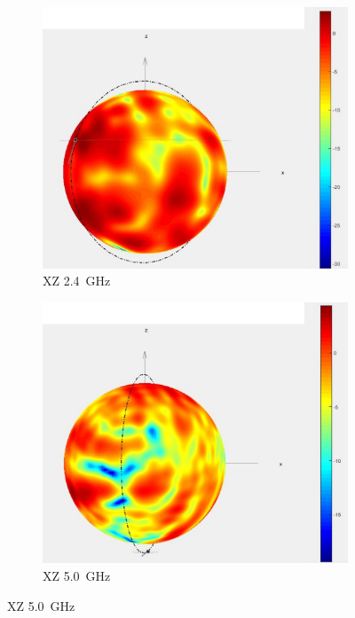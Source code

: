 \begin{figure}[h!]
\begin{center}
		\begin{subfigure}[t]{0.40\textwidth}
			\begin{center}
				\includegraphics[width=1\textwidth]{../fig/plt/star_lab_2ghz4_xz_reduced.png}
				\caption{XZ \SI{2.4}{\giga\hertz}}
			\end{center}
		\end{subfigure}
		\begin{subfigure}[t]{0.40\textwidth}
			\begin{center}
				\includegraphics[width=1\textwidth]{../fig/plt/star_lab_5ghz0_xz_reduced.png}
				\caption{XZ \SI{5.0}{\giga\hertz}}
			\end{center}
		\end{subfigure}
	

\end{center}
\end{figure}
